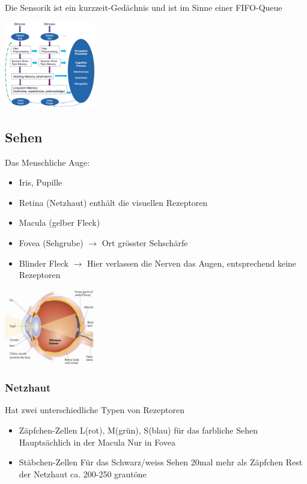 \documentclass{report}
\newenvironment{Figure}
	{\par\medskip\noindent\minipage{\linewidth}}
	{\endminipage\par\medskip}
\theoremstyle{definition}
\theoremstyle{example}
\begin{document}
Die Sensorik ist ein kurzzeit-Gedächnis und ist im Sinne einer FIFO-Queue

\begin{Figure}
   \centering
    \includegraphics[width=150px]{img/HumanRecognitionSystem.png}
        \label{fig:Abbildung des Ablaufs der Wahrnehmung eines Menschens}
\end{Figure}

\subsection{Sehen}
Das Menschliche Auge:
\begin{itemize}
   \item Iris, Pupille
   \item Retina (Netzhaut) enthält die visuellen Rezeptoren
   \item Macula (gelber Fleck)
   \item Fovea (Sehgrube) $\rightarrow$ Ort grösster Sehschärfe
   \item Blinder Fleck $\rightarrow$ Hier verlassen die Nerven das Augen, entsprechend keine Rezeptoren
\end{itemize}
\begin{Figure}
   \centering
    \includegraphics[width=150px]{img/Auge.png}
        \label{fig:Abbildung des menschlichen Auge}
\end{Figure}

\subsubsection{Netzhaut}
Hat zwei unterschiedliche Typen von Rezeptoren
\begin{itemize}
   \item Zäpfchen-Zellen
   \subitem L(rot), M(grün), S(blau)
   \subitem für das farbliche Sehen
   \subitem Hauptsächlich in der Macula
   \subitem  Nur in Fovea 
   \item Stäbchen-Zellen
   \subitem Für das Schwarz/weiss Sehen
   \subitem 20mal mehr als Zäpfchen
   \subitem Rest der Netzhaut
   \subitem ca. 200-250 grautöne
\end{itemize}
\end{document}
